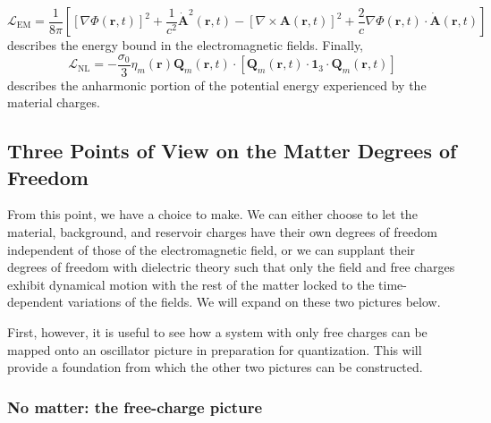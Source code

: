 \documentclass{article}
\begin{document}
\begin{equation}
\mathcal{L}_\mathrm{EM} = \frac{1}{8\pi}\left[\left[\nabla\Phi(\mathbf{r},t)\right]^2 + \frac{1}{c^2}\dot{\mathbf{A}}^2(\mathbf{r},t) - \left[\nabla\times\mathbf{A}(\mathbf{r},t)\right]^2 + \frac{2}{c}\nabla\Phi(\mathbf{r},t)\cdot\dot{\mathbf{A}}(\mathbf{r},t)\right]
\end{equation}
describes the energy bound in the electromagnetic fields. Finally, 
\begin{equation}
\mathcal{L}_\mathrm{NL} = - \frac{\sigma_0}{3}\eta_m(\mathbf{r})\mathbf{Q}_m(\mathbf{r},t)\cdot\left[\mathbf{Q}_m(\mathbf{r},t)\cdot\bm{1}_3\cdot\mathbf{Q}_m(\mathbf{r},t)\right]
\end{equation}
describes the anharmonic portion of the potential energy experienced by the material charges.









\subsection{Three Points of View on the Matter Degrees of Freedom}

From this point, we have a choice to make. We can either choose to let the material, background, and reservoir charges have their own degrees of freedom independent of those of the electromagnetic field, or we can supplant their degrees of freedom with dielectric theory such that only the field and free charges exhibit dynamical motion with the rest of the matter locked to the time-dependent variations of the fields. We will expand on these two pictures below.

First, however, it is useful to see how a system with only free charges can be mapped onto an oscillator picture in preparation for quantization. This will provide a foundation from which the other two pictures can be constructed.






\subsubsection{No matter: the free-charge picture}\label{sec:noMatter}
\end{document}
